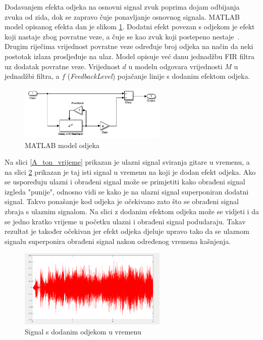 \documentclass[conference]{IEEEtran}
\begin{document}
Dodavanjem efekta odjeka na osnovni signal zvuk poprima dojam odbijanja zvuka od zida, dok se zapravo čuje
ponavljanje osnovnog signala. MATLAB model opisanog efekta dan je slikom \ref{echo_model}. Dodatni efekt povezan
s odjekom je efekt koji nastaje zbog povratne veze, a čuje se kao zvuk koji postepeno nestaje~\cite{b4}. Drugim riječima
vrijednost povratne veze određuje broj odjeka na način da neki postotak izlaza prosljeđuje na ulaz.
Model opisuje već danu jednadžbu FIR filtra uz dodatak povratne veze. Vrijednost $d$ u modelu odgovara vrijednosti
$M$ u jednadžbi filtra, a $f$ (\textit{FeedbackLevel}) pojačanje linije s dodanim efektom odjeka.

\begin{figure}[H]
    \includegraphics[width=200pt]{slike/echo_matlab.png}
    \centering
    \caption{MATLAB model odjeka}
    \label{echo_model}
\end{figure}

Na slici \ref{A_ton_vrijeme} prikazan je ulazni signal sviranja gitare u vremenu, a na slici \ref{echo_vrijeme} 
prikazan je taj isti signal u vremenu na koji je dodan efekt odjeka. Ako se uspoređuju ulazni i obrađeni signal može se 
primjetiti kako obrađeni signal izgleda "punije", odnosno vidi se kako je na ulazni signal superponiran dodatni signal.
Takvo ponašanje kod odjeka je očekivano zato što se obrađeni signal zbraja s ulaznim signalom. Na slici z dodanim
efektom odjeka može se vidjeti i da se jedno kratko vrijeme u početku ulazni i obrađeni signal podudaraju. Takav rezultat
je također očekivan jer efekt odjeka djeluje upravo tako da se ulaznom signalu superponira obrađeni signal nakon određenog
vremena kašnjenja.

\begin{figure}[H]
    \includegraphics[width=200pt]{slike/echo_vrijeme.png}
    \centering
    \caption{Signal s dodanim odjekom u vremenu}
    \label{echo_vrijeme}
\end{figure}
\end{document}
